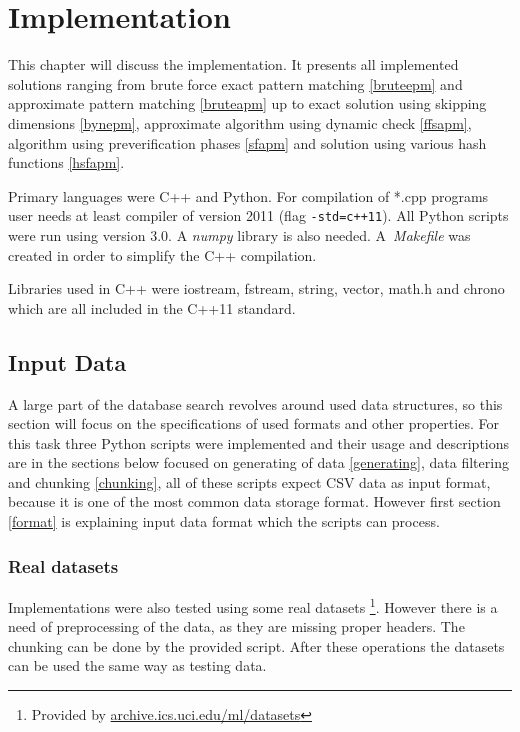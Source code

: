 \chapter{Implementation} \label{implementation}
This chapter will discuss the implementation. It presents all implemented solutions ranging from brute force exact pattern matching \ref{bruteepm} and approximate pattern matching \ref{bruteapm} up to exact solution using skipping dimensions \ref{bynepm}, approximate algorithm using dynamic check \ref{ffsapm}, algorithm using preverification phases \ref{sfapm} and solution using various hash functions \ref{hsfapm}.

Primary languages were C++ and Python. For compilation of *.cpp programs user needs at least compiler of version 2011 (flag \texttt{-std=c++11}). All Python scripts were run using version 3.0. A \textit{numpy} library is also needed. A~\textit{Makefile} was created in order to simplify the C++ compilation.

Libraries used in C++ were iostream, fstream, string, vector, math.h and chrono which are all included in the C++11 standard.

\section{Input Data}
A large part of the database search revolves around used data structures, so this section will focus on the specifications of used formats and other properties. For this task three Python scripts were implemented and their usage and descriptions are in the sections below focused on generating of data \ref{generating}, data filtering and chunking \ref{chunking}, all of these scripts expect CSV data as input format, because it is one of the most common data storage format. However first section \ref{format} is explaining input data format which the scripts can process.

\subsection{Real datasets}
Implementations were also tested using some real datasets \footnote{Provided by \url{archive.ics.uci.edu/ml/datasets}}. However there is a need of preprocessing of the data, as they are missing proper headers. The chunking can be done by the provided script. After these operations the datasets can be used the same way as testing data.

